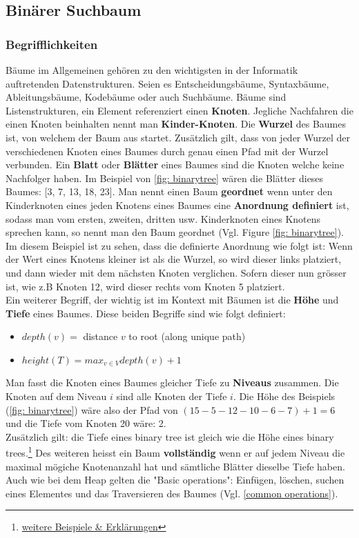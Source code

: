 \documentclass[a4paper]{article}
\begin{document}
\subsection{Binärer Suchbaum}
\subsubsection{Begrifflichkeiten}
Bäume im Allgemeinen gehören zu den wichtigsten in der Informatik auftretenden Datenstrukturen. Seien es Entscheidungsbäume, Syntaxbäume, Ableitungsbäume, Kodebäume oder auch Suchbäume. Bäume sind Listenstrukturen, ein Element referenziert einen \textbf{Knoten}. Jegliche Nachfahren die einen Knoten beinhalten nennt man \textbf{Kinder-Knoten}. Die \textbf{Wurzel} des Baumes ist, von welchem der Baum aus startet. Zusätzlich gilt, dass von jeder Wurzel der verschiedenen Knoten eines Baumes durch genau einen Pfad mit der Wurzel verbunden. Ein \textbf{Blatt} oder \textbf{Blätter} eines Baumes sind die Knoten welche keine Nachfolger haben. Im Beispiel von \ref{fig: binarytree} wären die Blätter dieses Baumes: [3, 7, 13, 18, 23]. Man nennt einen Baum \textbf{geordnet} wenn unter den Kinderknoten eines jeden Knotens eines Baumes eine \textbf{Anordnung definiert} ist, sodass man vom ersten, zweiten, dritten usw. Kinderknoten eines Knotens sprechen kann, so nennt man den Baum geordnet (Vgl. Figure \ref{fig: binarytree}). Im diesem Beispiel ist zu sehen, dass die definierte Anordnung wie folgt ist: Wenn der Wert eines Knotens kleiner ist als die Wurzel, so wird dieser links platziert, und dann wieder mit dem nächsten Knoten verglichen. Sofern dieser nun grösser ist, wie z.B Knoten 12, wird dieser rechts vom Knoten 5 platziert. \\
Ein weiterer Begriff, der wichtig ist im Kontext mit Bäumen ist die \textbf{Höhe} und \textbf{Tiefe} eines Baumes. Diese beiden Begriffe sind wie folgt definiert: 
\begin{itemize}
    \item $depth(v) = $ distance $v$ to root (along unique path)
    \item $height(T) = max_{v \in V} depth(v) + 1$
\end{itemize}
Man fasst die Knoten eines Baumes gleicher Tiefe zu \textbf{Niveaus} zusammen. Die Knoten auf dem Niveau $i$ sind alle Knoten der Tiefe $i$. Die Höhe des Beispiels (\ref{fig: binarytree}) wäre also der Pfad von $(15-5-12-10-6-7) + 1 = 6 $ und die Tiefe vom Knoten 20 wäre: 2. \\
Zusätzlich gilt: die Tiefe eines binary tree ist gleich wie die Höhe eines binary trees.\footnote{\href{https://www.baeldung.com/cs/binary-tree-height}{weitere Beispiele \& Erklärungen}}
Des weiteren heisst ein Baum \textbf{vollständig} wenn er auf jedem Niveau die maximal mögiche Knotenanzahl hat und sämtliche Blätter dieselbe Tiefe haben. 
Auch wie bei dem Heap gelten die "Basic operations": Einfügen, löschen, suchen eines Elementes und das Traversieren des Baumes (Vgl. \ref{common operations}).
\end{document}
